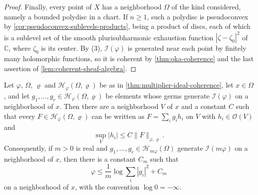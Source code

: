 \begin{proof}
Finally, every point of $X$ has a neighborhood $\Omega$ of the kind considered, namely a bounded polydisc in a chart. If $n\geq1$, such a polydisc is pseudoconvex by \cref{cor:pseudoconvex-sublevels-products}, being a product of discs, each of which is a sublevel set of the smooth plurisubharmonic exhaustion function $|\zeta-\zeta_0|^2$ of $\mathbb C$, where $\zeta_0$ is its center. By (3), $\mathcal I(\varphi)$ is generated near each point by finitely many holomorphic functions, so it is coherent by \cref{thm:oka-coherence} and the last assertion of \cref{lem:coherent-sheaf-algebra}.
\end{proof}

\begin{lemma}\label{lem:bounded-hilbert-ideal-generation}
Let $\varphi$, $\Omega$, $\varrho$ and $\mathcal H_\varphi(\Omega,\varrho)$ be as in \cref{thm:multiplier-ideal-coherence}, let $x\in\Omega$, and let $g_1,\ldots,g_r\in\mathcal H_\varphi(\Omega,\varrho)$ be elements whose germs generate $\mathcal I(\varphi)$ on a neighborhood of $x$. Then there are a neighborhood $V$ of $x$ and a constant $C$ such that every $F\in\mathcal H_\varphi(\Omega,\varrho)$ can be written as $F=\sum_ig_ih_i$ on $V$ with $h_i\in\mathcal O(V)$ and
\[
 \sup_V|h_i|\leq C\|F\|_{\varphi,\varrho}.
\]
Consequently, if $m>0$ is real and $g_1,\ldots,g_r\in\mathcal H_{m\varphi}(\Omega)$ generate $\mathcal I(m\varphi)$ on a neighborhood of $x$, then there is a constant $C_m$ such that
\begin{equation}\label{eq:weight-versus-multiplier-generators}
 \varphi\leq\frac1m\log\sum_i|g_i|^2+C_m
\end{equation}
on a neighborhood of $x$, with the convention $\log0=-\infty$.
\end{lemma}
